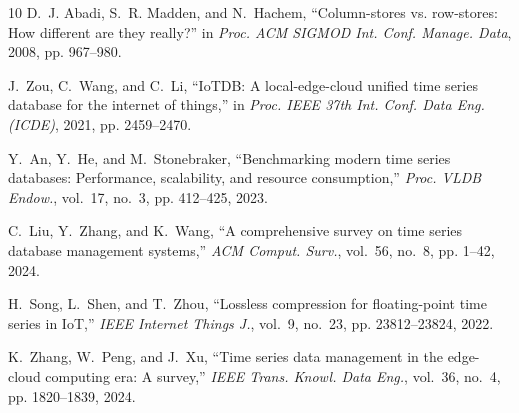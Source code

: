 \documentclass[conference,a4paper]{IEEEtran}
\begin{document}
\begin{thebibliography}{10}
D.~J. Abadi, S.~R. Madden, and N.~Hachem, ``Column-stores vs. row-stores: How different are they really?'' in \emph{Proc. ACM SIGMOD Int. Conf. Manage. Data}, 2008, pp. 967--980.

J.~Zou, C.~Wang, and C.~Li, ``IoTDB: A local-edge-cloud unified time series database for the internet of things,'' in \emph{Proc. IEEE 37th Int. Conf. Data Eng. (ICDE)}, 2021, pp. 2459--2470.

Y.~An, Y.~He, and M.~Stonebraker, ``Benchmarking modern time series databases: Performance, scalability, and resource consumption,'' \emph{Proc. VLDB Endow.}, vol.~17, no.~3, pp. 412--425, 2023.

C.~Liu, Y.~Zhang, and K.~Wang, ``A comprehensive survey on time series database management systems,'' \emph{ACM Comput. Surv.}, vol.~56, no.~8, pp. 1--42, 2024.

H.~Song, L.~Shen, and T.~Zhou, ``Lossless compression for floating-point time series in IoT,'' \emph{IEEE Internet Things J.}, vol.~9, no.~23, pp. 23812--23824, 2022.

K.~Zhang, W.~Peng, and J.~Xu, ``Time series data management in the edge-cloud computing era: A survey,'' \emph{IEEE Trans. Knowl. Data Eng.}, vol.~36, no.~4, pp. 1820--1839, 2024.

\end{thebibliography}
\end{document}
